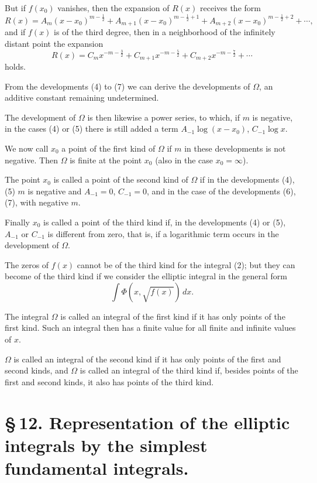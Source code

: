 \documentclass[11pt]{article}
\begin{document}
But if $f(x_0)$ vanishes, then the expansion of $R(x)$ receives the form
\begin{equation}
R(x)=A_m(x-x_0)^{m-\frac12}+A_{m+1}(x-x_0)^{m-\frac12+1}
+A_{m+2}(x-x_0)^{m-\frac12+2}+\cdots,
\tag{6}
\end{equation}
and if $f(x)$ is of the third degree, then in a neighborhood of the infinitely distant point the expansion
\begin{equation}
R(x)=C_mx^{-m-\frac32}+C_{m+1}x^{-m-\frac52}
+C_{m+2}x^{-m-\frac72}+\cdots
\tag{7}
\end{equation}
holds.

From the developments (4) to (7) we can derive the developments of $\Omega$, an additive constant remaining undetermined.

The development of $\Omega$ is then likewise a power series, to which, if $m$ is negative, in the cases (4) or (5) there is still added a term $A_{-1}\log(x-x_0)$, $C_{-1}\log x$.

We now call $x_0$ a point of the first kind of $\Omega$ if $m$ in these developments is not negative. Then $\Omega$ is finite at the point $x_0$ (also in the case $x_0=\infty$).

The point $x_0$ is called a point of the second kind of $\Omega$ if in the developments (4), (5) $m$ is negative and $A_{-1}=0$, $C_{-1}=0$, and in the case of the developments (6), (7), with negative $m$.

Finally $x_0$ is called a point of the third kind if, in the developments (4) or (5), $A_{-1}$ or $C_{-1}$ is different from zero, that is, if a logarithmic term occurs in the development of $\Omega$.

The zeros of $f(x)$ cannot be of the third kind for the integral (2); but they can become of the third kind if we consider the elliptic integral in the general form
\[
\int\Phi(x,\sqrt{f(x)})\,dx.
\]

The integral $\Omega$ is called an integral of the first kind if it has only points of the first kind. Such an integral then has a finite value for all finite and infinite values of $x$.

$\Omega$ is called an integral of the second kind if it has only points of the first and second kinds, and $\Omega$ is called an integral of the third kind if, besides points of the first and second kinds, it also has points of the third kind.

\section*{\S\,12. Representation of the elliptic integrals by the simplest fundamental integrals.}
\end{document}
